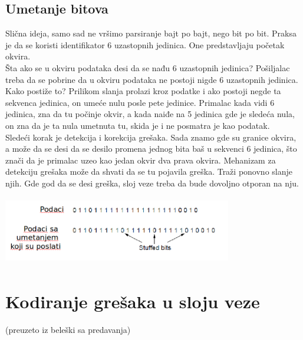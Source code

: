 \documentclass{article} %
\begin{document}
\subsection{Umetanje bitova}
Slična ideja, samo sad ne vršimo parsiranje bajt po bajt, nego bit po bit. Praksa je da se koristi identifikator 6 uzastopnih jedinica. One predstavljaju početak okvira.\\

Šta ako se u okviru podataka desi da se nađu 6 uzastopnih jedinica? Pošiljalac treba da se pobrine da u okviru podataka ne postoji nigde 6 uzastopnih jedinica. Kako postiže to? Prilikom slanja prolazi kroz podatke i ako postoji negde ta sekvenca jedinica, on umeće nulu posle pete jedinice. Primalac kada vidi 6 jedinica, zna da tu počinje okvir, a kada naiđe na 5 jedinica gde je sledeća nula, on zna da je ta nula umetnuta tu, skida je i ne posmatra je kao podatak.\\

Sledeći korak je detekcija i korekcija grešaka. Sada znamo gde su granice okvira, a može da se desi da se desilo promena jednog bita baš u sekvenci 6 jedinica, što znači da je primalac uzeo kao jedan okvir dva prava okvira. Mehanizam za detekciju grešaka može da shvati da se tu pojavila greška. Traži ponovno slanje njih. Gde god da se desi greška, sloj veze treba da bude dovoljno otporan na nju.
\begin{center}
\includegraphics[width=10cm, height=3cm]{umetanjeBitova}\\
\end{center}
\section{Kodiranje grešaka u sloju veze}
(preuzeto iz beleški sa predavanja)\\
\end{document}
